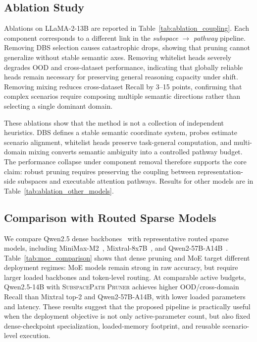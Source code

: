 \vspace{-1mm}
\subsection{Ablation Study}
\vspace{-1mm}
Ablations on LLaMA-2-13B are reported in Table~\ref{tab:ablation_coupling}. 
Each component corresponds to a different link in the \emph{subspace} $\rightarrow$ \emph{pathway} pipeline. 
Removing DBS selection causes catastrophic drops, showing that pruning cannot generalize without stable semantic axes. 
Removing whitelist heads severely degrades OOD and cross-dataset performance, indicating that globally reliable heads remain necessary for preserving general reasoning capacity under shift. 
Removing mixing reduces cross-dataset Recall by 3--15 points, confirming that complex scenarios require composing multiple semantic directions rather than selecting a single dominant domain.

These ablations show that the method is not a collection of independent heuristics. 
DBS defines a stable semantic coordinate system, probes estimate scenario alignment, whitelist heads preserve task-general computation, and multi-domain mixing converts semantic ambiguity into a controlled pathway budget. 
The performance collapse under component removal therefore supports the core claim: robust pruning requires preserving the coupling between representation-side subspaces and executable attention pathways. 
Results for other models are in Table~\ref{tab:ablation_other_models}.
\vspace{-1mm}

\subsection{Comparison with Routed Sparse Models}
\label{sec:moe_comparison}
\vspace{-1mm}
We compare Qwen2.5 dense backbones~\citep{yang2025qwen25} with representative routed sparse models, including MiniMax-M2~\citep{minimax2025m2}, Mixtral-8x7B~\citep{jiang2024mixtral}, and Qwen2-57B-A14B~\citep{yang2024qwen2}. 
Table~\ref{tab:moe_comparison} shows that dense pruning and MoE target different deployment regimes: MoE models remain strong in raw accuracy, but require larger loaded backbones and token-level routing. 
At comparable active budgets, Qwen2.5-14B with \textsc{SubspacePath Pruner} achieves higher OOD/cross-domain Recall than Mixtral top-2 and Qwen2-57B-A14B, with lower loaded parameters and latency. 
These results suggest that the proposed pipeline is practically useful when the deployment objective is not only active-parameter count, but also fixed dense-checkpoint specialization, loaded-memory footprint, and reusable scenario-level execution.
\vspace{-1mm}

